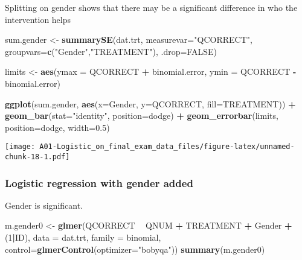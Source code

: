 \documentclass[]{article}
\newenvironment{Shaded}{\begin{snugshade}}{\end{snugshade}}
\newcommand{\KeywordTok}[1]{\textcolor[rgb]{0.13,0.29,0.53}{\textbf{#1}}}
\newcommand{\DataTypeTok}[1]{\textcolor[rgb]{0.13,0.29,0.53}{#1}}
\newcommand{\DecValTok}[1]{\textcolor[rgb]{0.00,0.00,0.81}{#1}}
\newcommand{\FloatTok}[1]{\textcolor[rgb]{0.00,0.00,0.81}{#1}}
\newcommand{\StringTok}[1]{\textcolor[rgb]{0.31,0.60,0.02}{#1}}
\newcommand{\OtherTok}[1]{\textcolor[rgb]{0.56,0.35,0.01}{#1}}
\newcommand{\OperatorTok}[1]{\textcolor[rgb]{0.81,0.36,0.00}{\textbf{#1}}}
\newcommand{\NormalTok}[1]{#1}
\begin{document}
Splitting on gender shows that there may be a significant difference in
who the intervention helps

\begin{Shaded}
\begin{Highlighting}[]
\NormalTok{sum.gender <-}\StringTok{ }\KeywordTok{summarySE}\NormalTok{(dat.trt, }\DataTypeTok{measurevar=}\StringTok{"QCORRECT"}\NormalTok{,}
                              \DataTypeTok{groupvars=}\KeywordTok{c}\NormalTok{(}\StringTok{"Gender"}\NormalTok{,}\StringTok{"TREATMENT"}\NormalTok{), }\DataTypeTok{.drop=}\OtherTok{FALSE}\NormalTok{)}

\NormalTok{limits <-}\StringTok{ }\KeywordTok{aes}\NormalTok{(}\DataTypeTok{ymax =}\NormalTok{ QCORRECT }\OperatorTok{+}\StringTok{ }\NormalTok{binomial.error, }\DataTypeTok{ymin =}\NormalTok{ QCORRECT }\OperatorTok{-}\StringTok{ }\NormalTok{binomial.error)}

\KeywordTok{ggplot}\NormalTok{(sum.gender, }\KeywordTok{aes}\NormalTok{(}\DataTypeTok{x=}\NormalTok{Gender, }\DataTypeTok{y=}\NormalTok{QCORRECT, }\DataTypeTok{fill=}\NormalTok{TREATMENT)) }\OperatorTok{+}\StringTok{ }
\StringTok{    }\KeywordTok{geom_bar}\NormalTok{(}\DataTypeTok{stat=}\StringTok{"identity"}\NormalTok{, }\DataTypeTok{position=}\NormalTok{dodge) }\OperatorTok{+}\StringTok{ }
\StringTok{    }\KeywordTok{geom_errorbar}\NormalTok{(limits, }\DataTypeTok{position=}\NormalTok{dodge, }\DataTypeTok{width=}\FloatTok{0.5}\NormalTok{)}
\end{Highlighting}
\end{Shaded}

\texttt{[image: A01-Logistic\_on\_final\_exam\_data\_files/figure-latex/unnamed-chunk-18-1.pdf]}

\subsubsection{Logistic regression with gender
added}\label{logistic-regression-with-gender-added}

Gender is significant.

\begin{Shaded}
\begin{Highlighting}[]
\NormalTok{m.gender0 <-}\StringTok{ }\KeywordTok{glmer}\NormalTok{(QCORRECT }\OperatorTok{~}\StringTok{ }\NormalTok{QNUM }\OperatorTok{+}\StringTok{ }\NormalTok{TREATMENT }\OperatorTok{+}\StringTok{ }\NormalTok{Gender }\OperatorTok{+}\StringTok{ }\NormalTok{(}\DecValTok{1}\OperatorTok{|}\NormalTok{ID), }
                \DataTypeTok{data =}\NormalTok{ dat.trt, }
                \DataTypeTok{family =}\NormalTok{ binomial, }\DataTypeTok{control=}\KeywordTok{glmerControl}\NormalTok{(}\DataTypeTok{optimizer=}\StringTok{"bobyqa"}\NormalTok{))}
\KeywordTok{summary}\NormalTok{(m.gender0)}
\end{Highlighting}
\end{Shaded}
\end{document}
